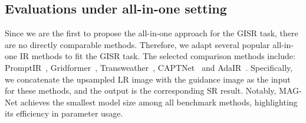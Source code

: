 \documentclass[lettersize,journal]{IEEEtran}
\begin{document}


\subsection{Evaluations under all-in-one setting}
Since we are the first to propose the all-in-one approach for the GISR task, there are no directly comparable methods. Therefore, we adapt several popular all-in-one IR methods to fit the GISR task. The selected comparison methods include: PromptIR~\cite{allinone_potlapalli2024promptir}, Gridformer~\cite{compare_allinone_wang2024gridformer}, Transweather~\cite{compare_allinone_valanarasu2022transweather}, CAPTNet~\cite{compare_allinone_gao2024prompt} and AdaIR~\cite{compare_allinone_cui2024adair}. 
Specifically, we concatenate the upsampled LR image with the guidance image as the input for these methods, and the output is the corresponding SR result.
Notably, MAG-Net achieves the smallest model size among all benchmark methods, highlighting its efficiency in parameter usage.

\end{document}
